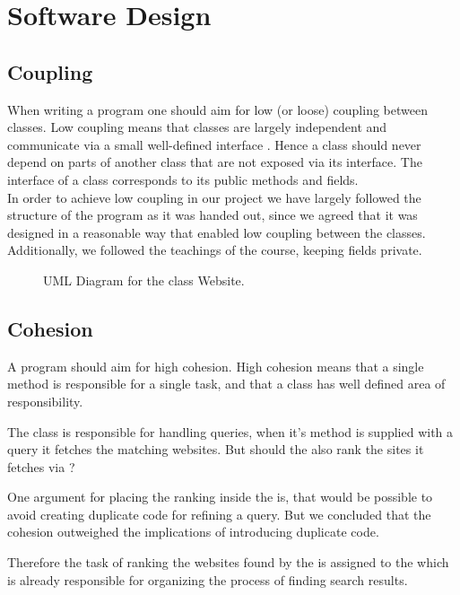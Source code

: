 \section{Software Design}

\subsection{Coupling}
When writing a program one should aim for low (or loose) coupling between classes. Low coupling means that classes are largely independent and communicate via a small well-defined interface \cite[p.259]{BK}. Hence a class should never depend on parts of another class that are not exposed via its interface. The interface of a class corresponds to its public methods and fields.
\\
In order to achieve low coupling in our project we have largely followed the structure of the program as it was handed out, since we agreed that it was designed in a reasonable way that enabled low coupling between the classes. Additionally, we followed the teachings of the course, keeping fields private.

 \begin{figure}[t]
	\centering
	\caption{UML Diagram for the class Website.}
	\label{fig:uml:single-class-website}
\end{figure}


\subsection{Cohesion}
A program should aim for high cohesion. %
High cohesion means that a single method is responsible for a single task, and that a class has well defined area of responsibility. 

The class  is responsible for handling queries, when it's method  is supplied with a query it fetches the matching websites. But should the  also rank the sites it fetches via ? 

One argument for placing the ranking inside the  is, that would be possible to avoid creating duplicate code for refining a query. But we concluded that the cohesion outweighed the implications of introducing duplicate code.

Therefore the task of ranking the websites found by the  is assigned to the   which is already responsible for organizing the process of finding search results.

